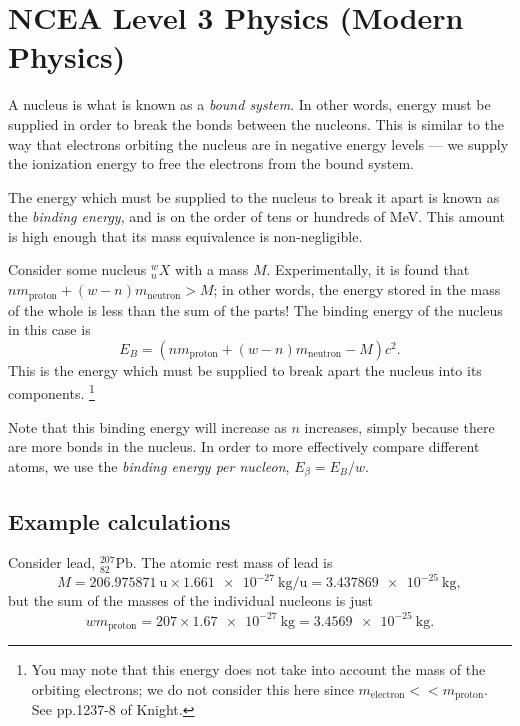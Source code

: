 \documentclass[answers]{exam}
\theoremstyle{definition}
\begin{document}
\section*{NCEA Level 3 Physics (Modern Physics)}
A nucleus is what is known as a \textit{bound system}. In other words, energy must be supplied
in order to break the bonds between the nucleons. This is similar to the way that electrons
orbiting the nucleus are in negative energy levels --- we supply the ionization energy to free
the electrons from the bound system.

The energy which must be supplied to the nucleus to break it apart is known as the \textit{binding
energy}, and is on the order of tens or hundreds of \si{\mega\electronvolt}. This amount is high
enough that its mass equivalence is non-negligible.

Consider some nucleus $ ^w_nX $ with a mass $ M $. Experimentally, it is found that $ nm_{\text{proton}} + (w - n)m_{\text{neutron}} > M $;
in other words, the energy stored in the mass of the whole is less than the sum of the parts! The binding energy of the nucleus
in this case is
\begin{displaymath}
  E_B = (nm_{\text{proton}} + (w - n)m_{\text{neutron}} - M)c^2.
\end{displaymath}
This is the energy which must be supplied to break apart the nucleus into its components.
\footnote{
  You may note that this energy does not take into account the mass of the orbiting electrons; we do not consider this
  here since $ m_\text{electron} << m_\text{proton} $. See pp.1237-8 of Knight.
}

Note that this binding energy will increase as $ n $ increases, simply because there are more bonds
in the nucleus. In order to more effectively compare different atoms, we use the \textit{binding energy
per nucleon}, $ E_\beta = E_B/w $.

\subsection*{Example calculations}
Consider lead, $ ^{207}_{82}\mathrm{Pb} $. The atomic rest mass of lead is
\begin{displaymath}
  M = \SI{206.975871}{\amu} \times \SI{1.661e-27}{\kilo\gram\per\amu} = \SI{3.437869e-25}{\kilo\gram},
\end{displaymath}
but the sum of the masses of the individual nucleons is just
\begin{displaymath}
  wm_\text{proton} = 207\times\SI{1.67e-27}{\kilo\gram} = \SI{3.4569e-25}{\kilo\gram}.
\end{displaymath}
\end{document}
